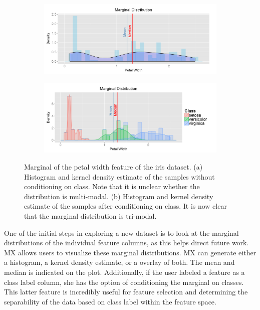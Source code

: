 \documentclass[twoside,leqno,twocolumn]{article}
\begin{document}
\begin{figure}[t!]
	\centering
	\begin{subfigure}[t]{0.48\textwidth}
		\includegraphics[width=\textwidth,valign=t]{Figures/Iris/MarginalPetalWidthnocond.png}
		\subcaption{}
		\label{fig:FigMarginalNoCond}
	\end{subfigure}
	\begin{subfigure}[t]{0.48\textwidth}
		\includegraphics[width=\textwidth,valign=t]{Figures/Iris/MarginalPetalWidth.png}
		\subcaption{}
		\label{fig:FigMarginal}
	\end{subfigure}
	\caption{Marginal of the petal width feature of the iris dataset. (a) Histogram and kernel density estimate of the samples without conditioning on class. Note that it is unclear whether the distribution is multi-modal. (b) Histogram and kernel density estimate of the samples after conditioning on class. It is now clear that the marginal distribution is tri-modal.}
	\label{fig:FigSample}
\end{figure}

One of the initial steps in exploring a new dataset is to look at the marginal distributions of the individual feature columns, as this helps direct future work. MX allows users to visualize these marginal distributions. MX can generate either a histogram, a kernel density estimate, or a overlay of both. The mean and median is indicated on the plot. Additionally, if the user labeled a feature as a class label column, she has the option of conditioning the marginal on classes. This latter feature is incredibly useful for feature selection and determining the separability of the data based on class label within the feature space.
\end{document}
